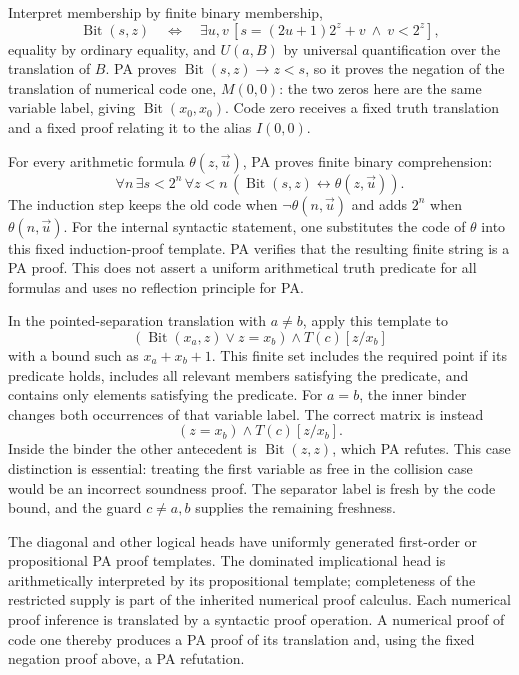 Interpret membership by finite binary membership,
\[
 \operatorname{Bit}(s,z)\quad\Longleftrightarrow\quad
 \exists u,v\,[s=(2u+1)2^z+v\ \wedge\ v<2^z],
\]
equality by ordinary equality, and $U(a,B)$ by universal quantification
over the translation of $B$. PA proves
$\operatorname{Bit}(s,z)\to z<s$, so it proves the negation of the
translation of numerical code one, $M(0,0)$: the two zeros here are the
same variable label, giving $\operatorname{Bit}(x_0,x_0)$.
Code zero receives a fixed truth translation and a fixed proof relating
it to the alias $I(0,0)$.

For every arithmetic formula $\theta(z,\vec u)$, PA proves finite binary
comprehension:
\[
 \forall n\,\exists s<2^n\,\forall z<n\,
   (\operatorname{Bit}(s,z)\leftrightarrow\theta(z,\vec u)).
\]
The induction step keeps the old code when $\neg\theta(n,\vec u)$ and
adds $2^n$ when $\theta(n,\vec u)$. For the internal syntactic statement,
one substitutes the code of $\theta$ into this fixed induction-proof
template. PA verifies that the resulting finite string is a PA proof.
This does not assert a uniform arithmetical truth predicate for all
formulas and uses no reflection principle for PA.

In the pointed-separation translation with $a\ne b$, apply this template
to
\[
 (\operatorname{Bit}(x_a,z)\lor z=x_b)\wedge T(c)[z/x_b]
\]
with a bound such as $x_a+x_b+1$. This finite set includes the required
point if its predicate holds, includes all relevant members satisfying
the predicate, and contains only elements satisfying the predicate.
For $a=b$, the inner binder changes both occurrences of that variable
label. The correct matrix is instead
\[
                  (z=x_b)\wedge T(c)[z/x_b].
\]
Inside the binder the other antecedent is
$\operatorname{Bit}(z,z)$, which PA refutes. This case distinction is
essential: treating the first variable as free in the collision case
would be an incorrect soundness proof. The separator label is fresh by
the code bound, and the guard $c\ne a,b$ supplies the remaining freshness.

The diagonal and other logical heads have uniformly generated
first-order or propositional PA proof templates. The dominated
implicational head is arithmetically interpreted by its propositional
template; completeness of the restricted supply is part of the inherited
numerical proof calculus. Each numerical proof inference is translated
by a syntactic proof operation. A numerical proof of code one thereby
produces a PA proof of its translation and, using the fixed negation
proof above, a PA refutation.

